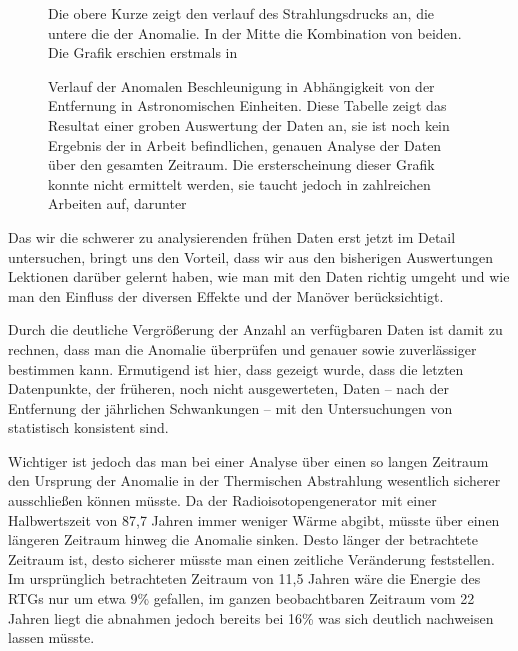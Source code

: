 \begin{figure}[htnb]
\begin{center}
\noindent    
{}
\end{center}
\vskip -10pt
  \caption{
Die obere Kurze zeigt den verlauf des Strahlungsdrucks an, die untere die der Anomalie. In der Mitte die Kombination von beiden. Die Grafik erschien erstmals in \cite{Anderson1992}}
\label{fig:forces}
\end{figure} 

\begin{figure}[htnb]
\begin{center}
\noindent    
{}
\end{center}
\vskip -10pt
  \caption{
Verlauf der Anomalen Beschleunigung in Abhängigkeit von der Entfernung in Astronomischen Einheiten. Diese Tabelle zeigt das Resultat einer groben Auswertung der Daten an, sie ist noch kein Ergebnis der in Arbeit befindlichen, genauen Analyse der Daten über den gesamten Zeitraum. Die ersterscheinung dieser Grafik konnte nicht ermittelt werden, sie taucht jedoch in zahlreichen Arbeiten auf, darunter\cite{Anderson2002}\cite{Nieto2005}
}
\label{fig:anomalie}
\end{figure} 

Das wir die schwerer zu analysierenden frühen Daten erst jetzt im Detail untersuchen, bringt uns den Vorteil, dass wir aus den bisherigen Auswertungen Lektionen darüber gelernt haben, wie man mit den Daten richtig umgeht und wie man den Einfluss der diversen Effekte und der Manöver berücksichtigt.\cite{Nieto2005}

Durch die deutliche Vergrößerung der Anzahl an verfügbaren Daten ist damit zu rechnen, dass man die Anomalie überprüfen und genauer sowie zuverlässiger bestimmen kann.
Ermutigend ist hier, dass gezeigt wurde, dass die letzten Datenpunkte, der früheren, noch nicht ausgewerteten, Daten – nach der Entfernung der jährlichen Schwankungen – mit den Untersuchungen von \cite{Anderson2002} statistisch konsistent sind.\cite{Nieto2005}

Wichtiger ist jedoch das man bei einer Analyse über einen so langen Zeitraum den Ursprung der Anomalie in der Thermischen Abstrahlung wesentlich sicherer ausschließen können müsste. Da der Radioisotopengenerator mit einer Halbwertszeit von 87,7 Jahren immer weniger Wärme abgibt, müsste über einen längeren Zeitraum hinweg die Anomalie sinken. Desto länger der betrachtete Zeitraum ist, desto sicherer müsste man einen zeitliche Veränderung feststellen.
Im ursprünglich betrachteten Zeitraum von 11,5 Jahren wäre die Energie des RTGs nur um etwa 9\% gefallen, im ganzen beobachtbaren Zeitraum vom 22 Jahren liegt die abnahmen jedoch bereits bei 16\% was sich deutlich nachweisen lassen müsste.

